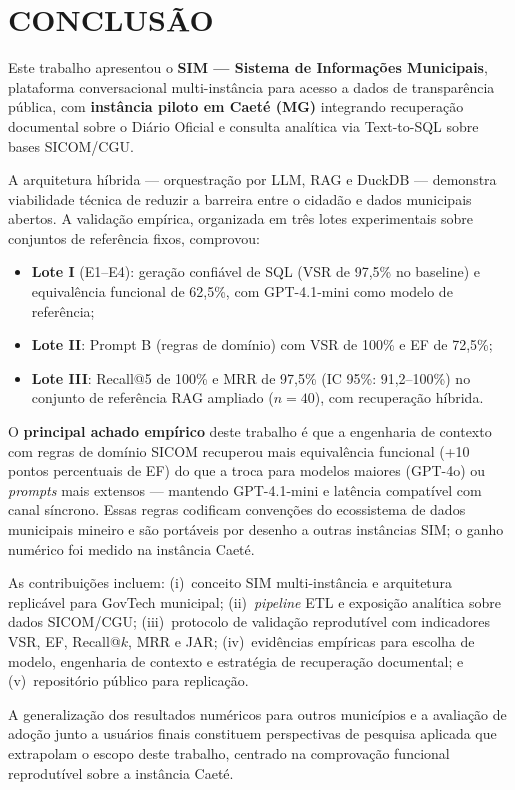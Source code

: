 \chapter{\MakeUppercase{Conclusão}}

Este trabalho apresentou o \textbf{SIM --- Sistema de Informações Municipais}, plataforma conversacional multi-instância para acesso a dados de transparência pública, com \textbf{instância piloto em Caeté (MG)} integrando recuperação documental sobre o Diário Oficial e consulta analítica via Text-to-SQL sobre bases SICOM/CGU.

A arquitetura híbrida --- orquestração por LLM, RAG e DuckDB --- demonstra viabilidade técnica de reduzir a barreira entre o cidadão e dados municipais abertos. A validação empírica, organizada em três lotes experimentais sobre conjuntos de referência fixos, comprovou:

\begin{itemize}
    \item \textbf{Lote I} (E1--E4): geração confiável de SQL (VSR de 97,5\% no baseline) e equivalência funcional de 62,5\%, com GPT-4.1-mini como modelo de referência;
    \item \textbf{Lote II}: Prompt B (regras de domínio) com VSR de 100\% e EF de 72,5\%;
    \item \textbf{Lote III}: Recall@5 de 100\% e MRR de 97,5\% (IC 95\%: 91,2--100\%) no conjunto de referência RAG ampliado ($n=40$), com recuperação híbrida.
\end{itemize}

O \textbf{principal achado empírico} deste trabalho é que a engenharia de contexto com regras de domínio SICOM recuperou mais equivalência funcional (+10 pontos percentuais de EF) do que a troca para modelos maiores (GPT-4o) ou \textit{prompts} mais extensos --- mantendo GPT-4.1-mini e latência compatível com canal síncrono. Essas regras codificam convenções do ecossistema de dados municipais mineiro e são portáveis por desenho a outras instâncias SIM; o ganho numérico foi medido na instância Caeté.

As contribuições incluem: (i)~conceito SIM multi-instância e arquitetura replicável para GovTech municipal; (ii)~\textit{pipeline} ETL e exposição analítica sobre dados SICOM/CGU; (iii)~protocolo de validação reprodutível com indicadores VSR, EF, Recall@$k$, MRR e JAR; (iv)~evidências empíricas para escolha de modelo, engenharia de contexto e estratégia de recuperação documental; e (v)~repositório público para replicação.

A generalização dos resultados numéricos para outros municípios e a avaliação de adoção junto a usuários finais constituem perspectivas de pesquisa aplicada que extrapolam o escopo deste trabalho, centrado na comprovação funcional reprodutível sobre a instância Caeté.
